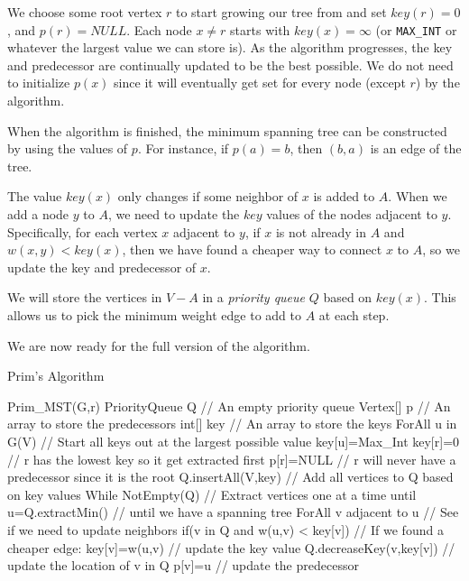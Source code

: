 We choose some root vertex $r$ to start growing our tree from 
and set $key(r)=0$, and $p(r)=NULL$.
Each node $x\neq r$ starts with $key(x)=\infty$
(or \verb+MAX_INT+ or whatever the largest value we can
store is).
As the algorithm progresses, the key and predecessor 
are continually updated to be the best possible.
We do not need to initialize $p(x)$ since it will eventually 
get set for every node (except $r$) by the algorithm.

When the algorithm is finished, the minimum spanning tree can
be constructed by using the values of $p$. For instance, 
if $p(a)=b$, then $(b,a)$ is an edge of the tree.

The value $key(x)$ only changes if some neighbor of $x$
is added to $A$.
When we add a node $y$ to $A$, we need to update the
$key$ values of the nodes adjacent to $y$.
Specifically, for each vertex $x$ adjacent to $y$, 
if $x$ is not already in $A$ and $w(x,y)<key(x)$, 
then we have found a cheaper way to 
connect $x$ to $A$, so we update the key and predecessor of $x$.

We will store the vertices in $V-A$ in a {\em priority queue} $Q$ 
based on $key(x)$.  
This allows us to pick the minimum weight edge
to add to $A$ at each step.

We are now ready for the full version of the algorithm.

\begin{proc}
Prim's Algorithm
\begin{code}
Prim_MST(G,r)
  PriorityQueue Q   // An empty priority queue
  Vertex[] p        // An array to store the predecessors
  int[] key         // An array to store the keys 
  ForAll u in G(V)  // Start all keys out at the largest possible value
      key[u]=Max_Int
  key[r]=0    // r has the lowest key so it get extracted first
  p[r]=NULL   // r will never have a predecessor since it is the root
  Q.insertAll(V,key) // Add all vertices to Q based on key values
  While NotEmpty(Q)     // Extract vertices one at a time until  
      u=Q.extractMin()  //    until we have a spanning tree   
      ForAll v adjacent to u  // See if we need to update neighbors
        if(v in Q and w(u,v) < key[v]) // If we found a cheaper edge:
            key[v]=w(u,v)              // update the key value
            Q.decreaseKey(v,key[v])    // update the location of v in Q
            p[v]=u                     // update the predecessor
\end{code}
\end{proc}


